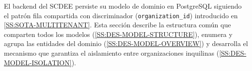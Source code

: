 El backend del SCDEE persiste su modelo de dominio en PostgreSQL siguiendo
el patrón fila compartida con discriminador (\texttt{organization\_id})
introducido en \cref{SS:SOTA-MULTITENANT}. Esta sección describe la
estructura común que comparten todos los modelos
(\cref{SS:DES-MODEL-STRUCTURE}), enumera y agrupa las entidades del dominio
(\cref{SS:DES-MODEL-OVERVIEW}) y desarrolla el mecanismo que garantiza el
aislamiento entre organizaciones inquilinas
(\cref{SS:DES-MODEL-ISOLATION}).
